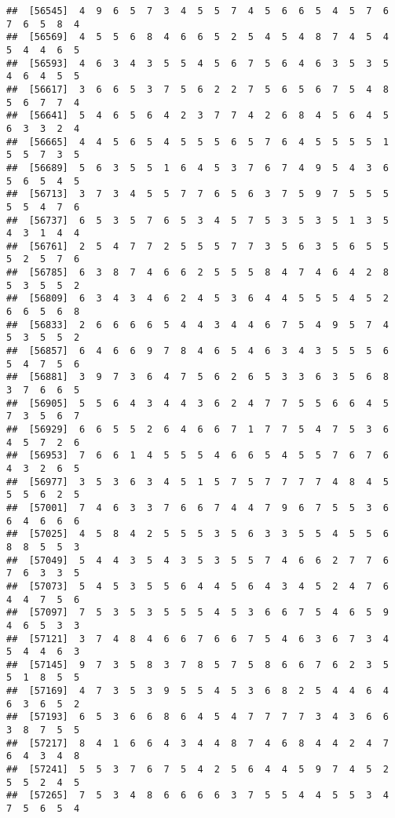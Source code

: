\documentclass[
]{book}
\begin{document}
\begin{verbatim}
##  [56545]  4  9  6  5  7  3  4  5  5  7  4  5  6  6  5  4  5  7  6  7  6  5  8  4
##  [56569]  4  5  5  6  8  4  6  6  5  2  5  4  5  4  8  7  4  5  4  5  4  4  6  5
##  [56593]  4  6  3  4  3  5  5  4  5  6  7  5  6  4  6  3  5  3  5  4  6  4  5  5
##  [56617]  3  6  6  5  3  7  5  6  2  2  7  5  6  5  6  7  5  4  8  5  6  7  7  4
##  [56641]  5  4  6  5  6  4  2  3  7  7  4  2  6  8  4  5  6  4  5  6  3  3  2  4
##  [56665]  4  4  5  6  5  4  5  5  5  6  5  7  6  4  5  5  5  5  1  5  5  7  3  5
##  [56689]  5  6  3  5  5  1  6  4  5  3  7  6  7  4  9  5  4  3  6  5  6  5  4  5
##  [56713]  3  7  3  4  5  5  7  7  6  5  6  3  7  5  9  7  5  5  5  5  5  4  7  6
##  [56737]  6  5  3  5  7  6  5  3  4  5  7  5  3  5  3  5  1  3  5  4  3  1  4  4
##  [56761]  2  5  4  7  7  2  5  5  5  7  7  3  5  6  3  5  6  5  5  5  2  5  7  6
##  [56785]  6  3  8  7  4  6  6  2  5  5  5  8  4  7  4  6  4  2  8  5  3  5  5  2
##  [56809]  6  3  4  3  4  6  2  4  5  3  6  4  4  5  5  5  4  5  2  6  6  5  6  8
##  [56833]  2  6  6  6  6  5  4  4  3  4  4  6  7  5  4  9  5  7  4  5  3  5  5  2
##  [56857]  6  4  6  6  9  7  8  4  6  5  4  6  3  4  3  5  5  5  6  5  4  7  5  6
##  [56881]  3  9  7  3  6  4  7  5  6  2  6  5  3  3  6  3  5  6  8  3  7  6  6  5
##  [56905]  5  5  6  4  3  4  4  3  6  2  4  7  7  5  5  6  6  4  5  7  3  5  6  7
##  [56929]  6  6  5  5  2  6  4  6  6  7  1  7  7  5  4  7  5  3  6  4  5  7  2  6
##  [56953]  7  6  6  1  4  5  5  5  4  6  6  5  4  5  5  7  6  7  6  4  3  2  6  5
##  [56977]  3  5  3  6  3  4  5  1  5  7  5  7  7  7  7  4  8  4  5  5  5  6  2  5
##  [57001]  7  4  6  3  3  7  6  6  7  4  4  7  9  6  7  5  5  3  6  6  4  6  6  6
##  [57025]  4  5  8  4  2  5  5  5  3  5  6  3  3  5  5  4  5  5  6  8  8  5  5  3
##  [57049]  5  4  4  3  5  4  3  5  3  5  5  7  4  6  6  2  7  7  6  7  6  3  3  5
##  [57073]  5  4  5  3  5  5  6  4  4  5  6  4  3  4  5  2  4  7  6  4  4  7  5  6
##  [57097]  7  5  3  5  3  5  5  5  4  5  3  6  6  7  5  4  6  5  9  4  6  5  3  3
##  [57121]  3  7  4  8  4  6  6  7  6  6  7  5  4  6  3  6  7  3  4  5  4  4  6  3
##  [57145]  9  7  3  5  8  3  7  8  5  7  5  8  6  6  7  6  2  3  5  5  1  8  5  5
##  [57169]  4  7  3  5  3  9  5  5  4  5  3  6  8  2  5  4  4  6  4  6  3  6  5  2
##  [57193]  6  5  3  6  6  8  6  4  5  4  7  7  7  7  3  4  3  6  6  3  8  7  5  5
##  [57217]  8  4  1  6  6  4  3  4  4  8  7  4  6  8  4  4  2  4  7  6  4  3  4  8
##  [57241]  5  5  3  7  6  7  5  4  2  5  6  4  4  5  9  7  4  5  2  5  5  2  4  5
##  [57265]  7  5  3  4  8  6  6  6  6  3  7  5  5  4  4  5  5  3  4  7  5  6  5  4

\end{verbatim}
\end{document}

